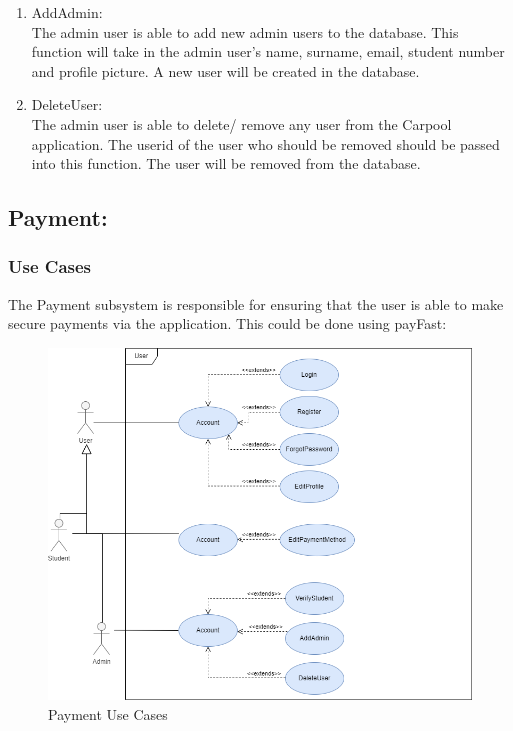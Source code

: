 \documentclass[hidelinks, 12pt, a4paper]{article}
\begin{document}
\begin{enumerate}[label=U1.\arabic*]
                \item AddAdmin:\\
                	The admin user is able to add new admin users to the database. This function will take in the admin user’s name, surname, email, student number and profile picture. A new user will be created in the database.
                	
                \item DeleteUser: \\
                    The admin user is able to delete/ remove any user from the Carpool application. The userid of the user who should be removed should be passed into this function. The user will be removed from the database.
                    
                    \end{enumerate}
                    
\newpage
                \subsection{Payment:}
                \subsubsection{Use Cases}
                  The Payment subsystem is responsible for ensuring that the user is able to make secure payments via the application. This could be done using payFast:
                    
                    \begin{figure}[H]
                    
                        \centering
                        \includegraphics[width=15cm]{images/User Usecase.drawio.png}
                        \caption{Payment Use Cases}
                        \label{fig:User UseCases}
                        
                    \end{figure}
                    
\end{document}
